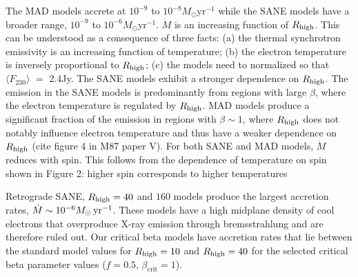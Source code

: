 The MAD models accrete at $10^{-9}$ to $10^{-8} M_{\odot}$yr$^{-1}$ while the SANE models have a broader range, $10^{-9}$ to $10^{-6} M_{\odot}$yr$^{-1}$. $\dot{M}$ is an increasing function of $R_\mathrm{high}$. This can be understood as a consequence of three facts: (a) the thermal synchrotron emissivity is an increasing function of temperature; (b) the electron temperature is inversely proportional to $R_\mathrm{high}$; (c) the models need to normalized so that $\langle F_{230}\rangle$ $=$ 2.4Jy. The SANE models exhibit a stronger dependence on $R_\mathrm{high}$. The emission in the SANE models is predominantly from regions with large $\beta$, where the electron temperature is regulated by $R_\mathrm{high}$. MAD models produce a significant fraction of the emission in regions with $\beta\sim 1$, where $R_\mathrm{high}$ does not notably influence electron temperature and thus have a weaker dependence on $R_\mathrm{high}$ (cite figure 4 in M87 paper V). For both SANE and MAD models, $\dot{M}$ reduces with spin. This follows from the dependence of temperature on spin shown in Figure 2: higher spin corresponds to higher temperatures

Retrograde SANE, $R_\mathrm{high}=40$ and $160$ models produce the largest accretion rates, $\dot{M} \sim 10^{-6}M_{\odot}\,\mathrm{yr}^{-1}$.  These models have a high midplane density of cool electrons that overproduce X-ray emission through bremsstrahlung and are therefore ruled out.   Our critical beta models have accretion rates that lie between the standard model values for $R_\mathrm{high} = 10$ and $R_\mathrm{high} = 40$ for the selected critical beta parameter values ($f=0.5$, $\beta_\mathrm{crit}=1$).


